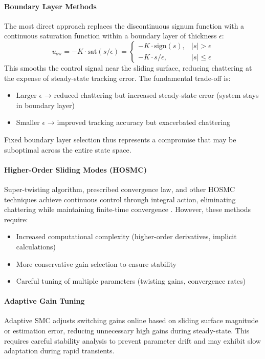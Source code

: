 \paragraph{Boundary Layer Methods}
The most direct approach replaces the discontinuous signum function with a continuous saturation function within a boundary layer of thickness $\epsilon$:
\begin{equation}
    u_{\text{sw}} = -K \cdot \text{sat}(s/\epsilon) =
    \begin{cases}
        -K \cdot \text{sign}(s), & |s| > \epsilon \\
        -K \cdot s/\epsilon, & |s| \leq \epsilon
    \end{cases}
\end{equation}
This smooths the control signal near the sliding surface, reducing chattering at the expense of steady-state tracking error. The fundamental trade-off is:
\begin{itemize}
    \item Larger $\epsilon$ → reduced chattering but increased steady-state error (system stays in boundary layer)
    \item Smaller $\epsilon$ → improved tracking accuracy but exacerbated chattering
\end{itemize}
Fixed boundary layer selection thus represents a compromise that may be suboptimal across the entire state space.

\paragraph{Higher-Order Sliding Modes (HOSMC)}
Super-twisting algorithm, prescribed convergence law, and other HOSMC techniques achieve continuous control through integral action, eliminating chattering while maintaining finite-time convergence \cite{levant2003higher}. However, these methods require:
\begin{itemize}
    \item Increased computational complexity (higher-order derivatives, implicit calculations)
    \item More conservative gain selection to ensure stability
    \item Careful tuning of multiple parameters (twisting gains, convergence rates)
\end{itemize}

\paragraph{Adaptive Gain Tuning}
Adaptive SMC adjusts switching gains online based on sliding surface magnitude or estimation error, reducing unnecessary high gains during steady-state. This requires careful stability analysis to prevent parameter drift and may exhibit slow adaptation during rapid transients.

